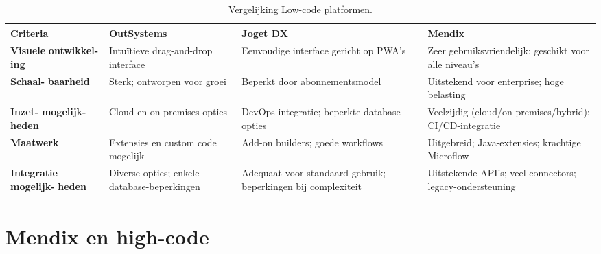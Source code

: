 \begin{table}
    \centering
    \begin{tabular}{ |p{2cm}|p{4cm}|p{4cm}|p{4cm}|   }
        \hline
        \textbf{Criteria} & \textbf{OutSystems} & \textbf{Joget DX}  & \textbf{Mendix} \\
        \hline
        \textbf{Visuele} \newline \textbf{ontwikkel-ing}  & Intuïtieve drag-and-drop interface & Eenvoudige interface gericht op \gls{PWA}'s & Zeer gebruiksvriendelijk; geschikt voor alle niveau's \\
        \hline
        \textbf{Schaal-} \newline \textbf{baarheid} & Sterk; ontworpen voor groei & Beperkt door abonnementsmodel & Uitstekend voor enterprise; hoge belasting \\
        \hline
        \textbf{Inzet-} \newline \textbf{mogelijk-} \newline \textbf{heden}  & Cloud en on-premises opties & DevOps-integratie; beperkte database-opties & Veelzijdig (cloud/on-premises/hybrid); CI/CD-integratie \\
        \hline
        \textbf{Maatwerk}  & Extensies en custom code mogelijk & Add-on builders; goede workflows & Uitgebreid; Java-extensies; krachtige Microflow \\
        \hline
        \textbf{Integratie} \newline \textbf{mogelijk-} \newline \textbf{heden} & Diverse opties; enkele database-beperkingen & Adequaat voor standaard gebruik; beperkingen bij complexiteit  & Uitstekende \gls{API}'s; veel connectors; legacy-ondersteuning\\
        \hline
    \end{tabular}
    \caption[\centering Low-Code Platforms Comparison]{\label{tab:Vergelijking Low-code platformen}Vergelijking Low-code platformen.}
\end{table}

\section{Mendix en high-code}
